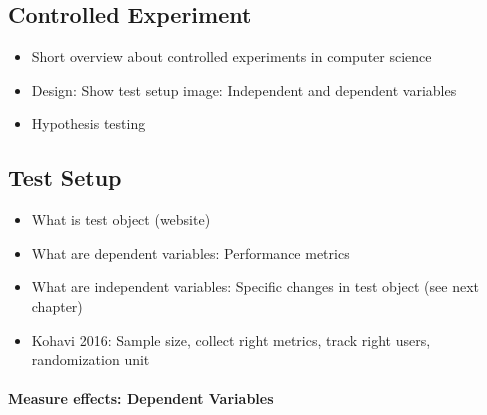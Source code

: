 








\subsection{Controlled Experiment}

\begin{itemize}
\item Short overview about controlled experiments in computer science
\item Design: Show test setup image: Independent and dependent variables
\item Hypothesis testing
\end{itemize}











\subsection{Test Setup}

\begin{itemize}
\item What is test object (website)
\item What are dependent variables: Performance metrics
\item What are independent variables: Specific changes in test object (see next chapter)
\item Kohavi 2016: Sample size, collect right metrics, track right users, randomization unit
\end{itemize}


\paragraph{Measure effects: Dependent Variables}

